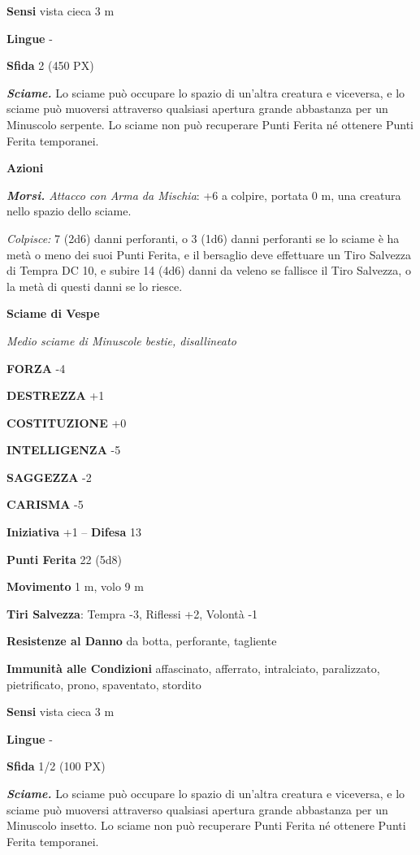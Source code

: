 \begin{multicols}{2}
	\textbf{Sensi} vista cieca 3 m

	\textbf{Lingue} -

	\textbf{Sfida} 2 (450 PX)

	\textit{\textbf{Sciame.}} Lo sciame può occupare lo spazio di un'altra creatura e viceversa, e lo sciame può muoversi attraverso qualsiasi apertura grande abbastanza per un Minuscolo serpente. Lo sciame non può recuperare Punti Ferita né ottenere Punti Ferita temporanei.

	\textbf{Azioni}

	\textit{\textbf{Morsi.} Attacco con Arma da Mischia}: +6 a colpire, portata 0 m, una creatura nello spazio dello sciame.

	\textit{Colpisce:} 7 (2d6) danni perforanti, o 3 (1d6) danni perforanti se lo sciame è ha metà o meno dei suoi Punti Ferita, e il bersaglio deve effettuare un Tiro Salvezza di Tempra DC 10, e subire 14 (4d6) danni da veleno se fallisce il Tiro Salvezza, o la metà di questi danni se lo riesce.

	\medskip\textbf{Sciame di Vespe}

	\textit{Medio sciame di Minuscole bestie, disallineato}

	\textbf{FORZA} -4

	\textbf{DESTREZZA} +1

	\textbf{COSTITUZIONE} +0

	\textbf{INTELLIGENZA} -5

	\textbf{SAGGEZZA} -2

	\textbf{CARISMA} -5

	\textbf{Iniziativa} +1 -- \textbf{Difesa} 13

	\textbf{Punti Ferita} 22 (5d8)

	\textbf{Movimento} 1 m, volo 9 m

	\textbf{Tiri Salvezza}: Tempra -3, Riflessi +2, Volontà -1

	\textbf{Resistenze al Danno} da botta, perforante, tagliente

	\textbf{Immunità alle Condizioni} affascinato, afferrato, intralciato, paralizzato, pietrificato, prono, spaventato, stordito

	\textbf{Sensi} vista cieca 3 m

	\textbf{Lingue} -

	\textbf{Sfida} 1/2 (100 PX)

	\textit{\textbf{Sciame.}} Lo sciame può occupare lo spazio di un'altra creatura e viceversa, e lo sciame può muoversi attraverso qualsiasi apertura grande abbastanza per un Minuscolo insetto. Lo sciame non può recuperare Punti Ferita né ottenere Punti Ferita temporanei.


\end{multicols}
